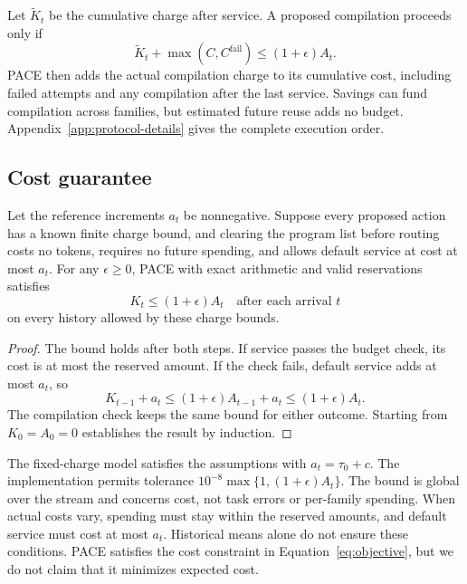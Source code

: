 Let $\widetilde K_t$ be the cumulative charge after service.
A proposed compilation proceeds only if
\begin{equation}
\widetilde K_t+\max(C,C^{\mathrm{fail}})\leq(1+\epsilon)A_t.
\label{eq:compile-budget}
\end{equation}
PACE then adds the actual compilation charge to its cumulative cost, including failed attempts and any compilation after the last service.
Savings can fund compilation across families, but estimated future reuse adds no budget.
Appendix~\ref{app:protocol-details} gives the complete execution order.

\subsection{Cost guarantee}
\label{sec:guarantee}

\begin{theorem}
\label{thm:cost-bound}
Let the reference increments $a_t$ be nonnegative.
Suppose every proposed action has a known finite charge bound, and clearing the program list before routing costs no tokens, requires no future spending, and allows default service at cost at most $a_t$.
For any $\epsilon\geq0$, PACE with exact arithmetic and valid reservations satisfies
\begin{equation}
K_t\leq(1+\epsilon)A_t
\quad\text{after each arrival }t
\label{eq:cost-guarantee}
\end{equation}
on every history allowed by these charge bounds.
\end{theorem}

\begin{proof}
The bound holds after both steps.
If service passes the budget check, its cost is at most the reserved amount.
If the check fails, default service adds at most $a_t$, so
\[
K_{t-1}+a_t\leq(1+\epsilon)A_{t-1}+a_t\leq(1+\epsilon)A_t.
\]
The compilation check keeps the same bound for either outcome.
Starting from $K_0=A_0=0$ establishes the result by induction.
\end{proof}

The fixed-charge model satisfies the assumptions with $a_t=\tau_0+c$.
The implementation permits tolerance $10^{-8}\max\{1,(1+\epsilon)A_t\}$.
The bound is global over the stream and concerns cost, not task errors or per-family spending.
When actual costs vary, spending must stay within the reserved amounts, and default service must cost at most $a_t$.
Historical means alone do not ensure these conditions.
PACE satisfies the cost constraint in Equation~\ref{eq:objective}, but we do not claim that it minimizes expected cost.
